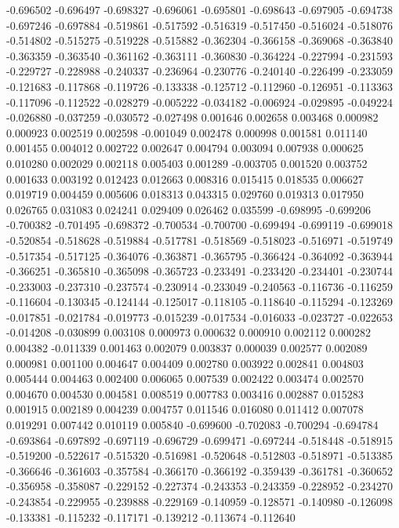 -0.696502
-0.696497
-0.698327
-0.696061
-0.695801
-0.698643
-0.697905
-0.694738
-0.697246
-0.697884
-0.519861
-0.517592
-0.516319
-0.517450
-0.516024
-0.518076
-0.514802
-0.515275
-0.519228
-0.515882
-0.362304
-0.366158
-0.369068
-0.363840
-0.363359
-0.363540
-0.361162
-0.363111
-0.360830
-0.364224
-0.227994
-0.231593
-0.229727
-0.228988
-0.240337
-0.236964
-0.230776
-0.240140
-0.226499
-0.233059
-0.121683
-0.117868
-0.119726
-0.133338
-0.125712
-0.112960
-0.126951
-0.113363
-0.117096
-0.112522
-0.028279
-0.005222
-0.034182
-0.006924
-0.029895
-0.049224
-0.026880
-0.037259
-0.030572
-0.027498
0.001646
0.002658
0.003468
0.000982
0.000923
0.002519
0.002598
-0.001049
0.002478
0.000998
0.001581
0.011140
0.001455
0.004012
0.002722
0.002647
0.004794
0.003094
0.007938
0.000625
0.010280
0.002029
0.002118
0.005403
0.001289
-0.003705
0.001520
0.003752
0.001633
0.003192
0.012423
0.012663
0.008316
0.015415
0.018535
0.006627
0.019719
0.004459
0.005606
0.018313
0.043315
0.029760
0.019313
0.017950
0.026765
0.031083
0.024241
0.029409
0.026462
0.035599
-0.698995
-0.699206
-0.700382
-0.701495
-0.698372
-0.700534
-0.700700
-0.699494
-0.699119
-0.699018
-0.520854
-0.518628
-0.519884
-0.517781
-0.518569
-0.518023
-0.516971
-0.519749
-0.517354
-0.517125
-0.364076
-0.363871
-0.365795
-0.366424
-0.364092
-0.363944
-0.366251
-0.365810
-0.365098
-0.365723
-0.233491
-0.233420
-0.234401
-0.230744
-0.233003
-0.237310
-0.237574
-0.230914
-0.233049
-0.240563
-0.116736
-0.116259
-0.116604
-0.130345
-0.124144
-0.125017
-0.118105
-0.118640
-0.115294
-0.123269
-0.017851
-0.021784
-0.019773
-0.015239
-0.017534
-0.016033
-0.023727
-0.022653
-0.014208
-0.030899
0.003108
0.000973
0.000632
0.000910
0.002112
0.000282
0.004382
-0.011339
0.001463
0.002079
0.003837
0.000039
0.002577
0.002089
0.000981
0.001100
0.004647
0.004409
0.002780
0.003922
0.002841
0.004803
0.005444
0.004463
0.002400
0.006065
0.007539
0.002422
0.003474
0.002570
0.004670
0.004530
0.004581
0.008519
0.007783
0.003416
0.002887
0.015283
0.001915
0.002189
0.004239
0.004757
0.011546
0.016080
0.011412
0.007078
0.019291
0.007442
0.010119
0.005840
-0.699600
-0.702083
-0.700294
-0.694784
-0.693864
-0.697892
-0.697119
-0.696729
-0.699471
-0.697244
-0.518448
-0.518915
-0.519200
-0.522617
-0.515320
-0.516981
-0.520648
-0.512803
-0.518971
-0.513385
-0.366646
-0.361603
-0.357584
-0.366170
-0.366192
-0.359439
-0.361781
-0.360652
-0.356958
-0.358087
-0.229152
-0.227374
-0.243353
-0.243359
-0.228952
-0.234270
-0.243854
-0.229955
-0.239888
-0.229169
-0.140959
-0.128571
-0.140980
-0.126098
-0.133381
-0.115232
-0.117171
-0.139212
-0.113674
-0.112640
